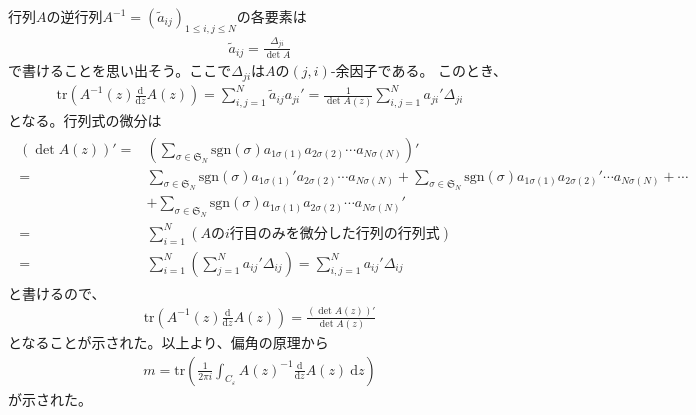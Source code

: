 \documentclass{jsarticle}
\def\diff{\textrm{d}}
\begin{document}
行列$A$の逆行列$A^{-1}=(\tilde{a}_{ij})_{1\leq i,j\leq N}$の各要素は
\begin{align}
\tilde{a}_{ij}=\frac{\Delta_{ji}}{\det A}
\end{align}
で書けることを思い出そう。ここで$\Delta_{ji}$は$A$の$(j,i)$-余因子である。
このとき、
\begin{align}
\mathrm{tr}\left(A^{-1}(z)\frac{\diff}{\diff z}A(z)\right)
=\sum_{i,j=1}^{N}\tilde{a}_{ij}a_{ji}'
=\frac{1}{\det A(z)}\sum_{i,j=1}^{N}a_{ji}'\Delta_{ji}
\end{align}
となる。行列式の微分は
\begin{align*}
\begin{aligned}
    \left(\det A(z)\right)'=&\left(\sum_{\sigma\in\mathfrak{S}_{N}}\mathrm{sgn}(\sigma)a_{1\sigma(1)}a_{2\sigma(2)}\cdots a_{N\sigma(N)}\right)'\\
    =&\sum_{\sigma\in\mathfrak{S}_{N}}\mathrm{sgn}(\sigma)a_{1\sigma(1)}'a_{2\sigma(2)}\cdots a_{N\sigma(N)}
    +\sum_{\sigma\in\mathfrak{S}_{N}}\mathrm{sgn}(\sigma)a_{1\sigma(1)}a_{2\sigma(2)}'\cdots a_{N\sigma(N)}+\cdots\\
    &+\sum_{\sigma\in\mathfrak{S}_{N}}\mathrm{sgn}(\sigma)a_{1\sigma(1)}a_{2\sigma(2)}\cdots a_{N\sigma(N)}'\\
    =&\sum_{i=1}^{N}(A\mathrm{の}i\mathrm{行目のみを微分した行列の行列式})\\
    =&\sum_{i=1}^{N}\left(\sum_{j=1}^{N}a_{ij}'\Delta_{ij}\right)
    =\sum_{i,j=1}^{N}a_{ij}'\Delta_{ij}
\end{aligned}
\end{align*}
と書けるので、
\begin{align}
\mathrm{tr}\left(A^{-1}(z)\frac{\diff}{\diff z}A(z)\right)=\frac{\left(\det A(z)\right)'}{\det A(z)}
\end{align}
となることが示された。以上より、偏角の原理から
\begin{align}
    m=\mathrm{tr}\left(\frac{1}{2\pi i}\int_{C_{\varepsilon}}A(z)^{-1}\frac{\diff}{\diff z}A(z)~\diff z\right)
\end{align}
が示された。
\end{document}
